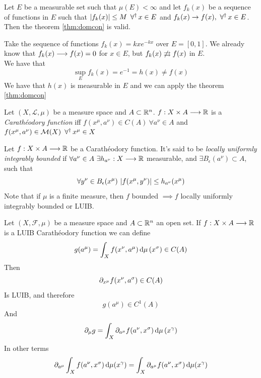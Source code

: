 \documentclass[../complete.tex]{subfiles}
\begin{document}
\begin{cor}
	Let $E$ be a measurable set such that $\mu\left( E \right)<\infty$ and let $f_k(x)$ be a sequence of functions in $E$ such that $\abs{f_k(x)}\le M\ \operatorname{\forall^\dagger} x\in E$ and $f_k(x)\to f(x),\ \operatorname{\forall^\dagger} x\in E$. Then the theorem \eqref{thm:domcon} is valid.
\end{cor}
\begin{eg}
	Take the sequence of functions $f_k(x)=kxe^{-kx}$ over $E=[0,1]$. We already know that $f_k(x)\overset{}{\longrightarrow} f(x)=0$ for $x\in E$, but $f_k(x)\not\rightrightarrows f(x)$ in $E$.\\
	We have that
	\begin{equation*}
		\sup_Ef_k(x)=e^{-1}=h(x)\ne f(x)
	\end{equation*}
	We have that $h(x)$ is measurable in $E$ and we can apply the theorem \eqref{thm:domcon}
\end{eg}
\begin{dfn}
	Let $(X,\mathcal{L},\mu)$ be a measure space and $A\subset\mathbb{R}^n$. $f:X\times A\overset{}{\longrightarrow}\mathbb{R}$ is a \textit{Carathéodory function} iff $f(x^\mu,a^\nu)\in C(A)\ \forall a^\nu\in A$ and $f(x^\mu,a^\nu)\in\mathcal{M}(X)\ \operatorname{\forall^\dagger} x^\mu\in X$
\end{dfn}
\begin{dfn}
	Let $f:X\times A\overset{}{\longrightarrow}\mathbb{R}$ be a Carathéodory function. It's said to be \textit{locally uniformly integrably bounded} if $\forall a^\nu\in A\ \exists h_{a^\nu}:X\overset{}{\longrightarrow}\mathbb{R}$ measurable, and $\exists B_\epsilon(a^\nu)\subset A$, such that
	\begin{equation*}
		\forall y^\nu\in B_\epsilon(x^\mu)\ \abs{f(x^\mu,y^\nu)}\le h_{a^\nu}(x^\mu)
	\end{equation*}
	Note that if $\mu$ is a finite measure, then $f$ bounded $\implies{} f$ locally uniformly integrably bounded or LUIB.
\end{dfn}
\begin{thm}
	Let $(X,\mathcal{F},\mu)$ be a measure space and $A\subset\mathbb{R}^n$ an open set. If $f:X\times A\overset{}{\longrightarrow}\mathbb{R}$ is a LUIB Carathéodory function we can define
	\begin{equation*}
		g(a^\mu)=\int_{X}^{}f(x^\nu,a^\mu)\operatorname{d\!}\mu\left( x^\sigma \right)\in C(A)
	\end{equation*}
	Then
	\begin{equation*}
		\partial_{x^\mu}f(x^\nu,a^\sigma)\in C(A)
	\end{equation*}
	Is LUIB, and therefore
	\begin{equation*}
		g(a^\mu)\in C^1(A)
	\end{equation*}
	And
	\begin{equation*}
		\partial_\mu g=\int_{X}^{}\partial_{a^\mu}f(a^\nu,x^\sigma)\operatorname{d\!}\mu\left( x^\gamma \right)
	\end{equation*}
	In other terms
	\begin{equation}
		\partial_{a^\mu}\int_{X}^{}f(a^\nu,x^\sigma)\operatorname{d\!}\mu(x^\gamma)=\int_{X}^{}\partial_{a^\mu}f(a^\nu,x^\sigma)\operatorname{d\!}\mu(x^\gamma)
		\label{eq:leibnizrule}
	\end{equation}
\end{thm}
\end{document}
